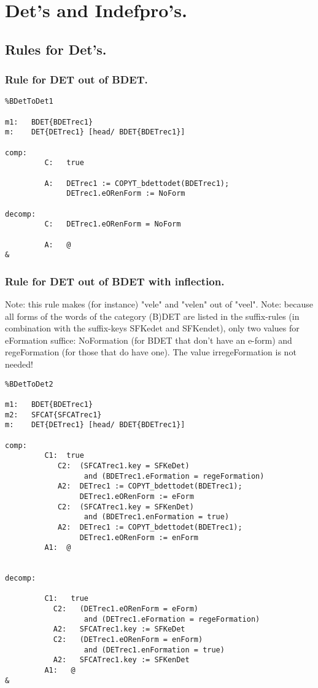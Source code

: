 \section{Det's and Indefpro's.}
\subsection{Rules for Det's.}
\subsubsection{Rule for DET out of BDET.}
\begin{verbatim}
%BDetToDet1

m1:   BDET{BDETrec1}
m:    DET{DETrec1} [head/ BDET{BDETrec1}]

comp:    
         C:   true

         A:   DETrec1 := COPYT_bdettodet(BDETrec1);
              DETrec1.eORenForm := NoForm

decomp:  
         C:   DETrec1.eORenForm = NoForm

         A:   @
&
\end{verbatim}
\newpage
\subsubsection{Rule for DET out of BDET with inflection.}

Note: this rule makes (for instance) "vele" and "velen" out of "veel".
Note: because all forms of the words of the category (B)DET are listed in the
      suffix-rules (in combination with the suffix-keys SFKedet and SFKendet),
      only two values for eFormation suffice: NoFormation (for BDET that don't
      have an e-form) and regeFormation (for those that do have one). The value 
      irregeFormation is not needed!
\begin{verbatim}
%BDetToDet2

m1:   BDET{BDETrec1}
m2:   SFCAT{SFCATrec1}
m:    DET{DETrec1} [head/ BDET{BDETrec1}]

comp:    
         C1:  true
            C2:  (SFCATrec1.key = SFKeDet) 
                  and (BDETrec1.eFormation = regeFormation)
            A2:  DETrec1 := COPYT_bdettodet(BDETrec1);
                 DETrec1.eORenForm := eForm
            C2:  (SFCATrec1.key = SFKenDet) 
                  and (BDETrec1.enFormation = true)
            A2:  DETrec1 := COPYT_bdettodet(BDETrec1);
                 DETrec1.eORenForm := enForm
         A1:  @


decomp:  

         C1:   true
           C2:   (DETrec1.eORenForm = eForm) 
                  and (DETrec1.eFormation = regeFormation)
           A2:   SFCATrec1.key := SFKeDet 
           C2:   (DETrec1.eORenForm = enForm) 
                  and (DETrec1.enFormation = true)
           A2:   SFCATrec1.key := SFKenDet 
         A1:   @
&
\end{verbatim}
\newpage
